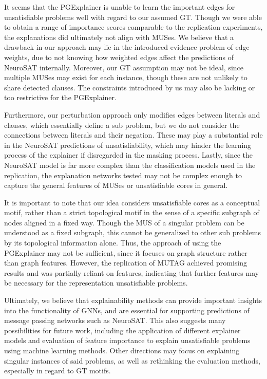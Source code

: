 It seems that the PGExplainer is unable to learn the important edges for unsatisfiable problems well with regard to our assumed GT. Though we were able to obtain a range of importance scores comparable to the replication experiments, the explanations did ultimately not align with MUSes. We believe that a drawback in our approach may lie in the introduced evidence problem of edge weights, due to not knowing how weighted edges affect the predictions of NeuroSAT internally. Moreover, our GT assumption may not be ideal, since multiple MUSes may exist for each instance, though these are not unlikely to share detected clauses. The constraints introduced by us may also be lacking or too restrictive for the PGExplainer.

Furthermore, our perturbation approach only modifies edges between literals and clauses, which essentially define a sub problem, but we do not consider the connections between literals and their negation. These may play a substantial role in the NeuroSAT predictions of unsatisfiability, which may hinder the learning process of the explainer if disregarded in the masking process. Lastly, since the NeuroSAT model is far more complex than the classification models used in the replication, the explanation networks tested may not be complex enough to capture the general features of MUSes or unsatisfiable cores in general. \bigskip

It is important to note that our idea considers unsatisfiable cores as a conceptual motif, rather than a strict topological motif in the sense of a specific subgraph of nodes aligned in a fixed way. Though the MUS of a singular problem can be understood as a fixed subgraph, this cannot be generalized to other sub problems by its topological information alone. Thus, the approach of using the PGExplainer may not be sufficient, since it focuses on graph structure rather than graph features. However, the replication of MUTAG achieved promising results and was partially reliant on features, indicating that further features may be necessary for the representation unsatisfiable problems. \bigskip

Ultimately, we believe that explainability methods can provide important insights into the functionality of GNNs, and are essential for supporting predictions of message passing networks such as NeuroSAT. This also suggests many possibilities for future work, including the application of different explainer models and evaluation of feature importance to explain unsatisfiable problems using machine learning methods. Other directions may focus on explaining singular instances of said problems, as well as rethinking the evaluation methods, especially in regard to \ac{GT} motifs.